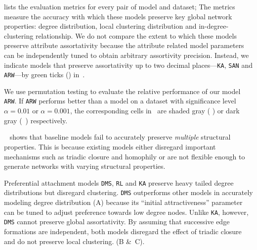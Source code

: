  lists the evaluation metrics for every pair of model
and dataset; The metrics measure the accuracy with which these models
preserve key global network properties: degree distribution, local clustering distribution
and in-degree-clustering relationship. We do not compare the extent to which these models preserve attribute assortativity because the attribute related model parameters can be independently tuned to obtain arbitrary assortivity precision. Instead, we indicate models that preserve assortativity up to two decimal
places---\texttt{KA}, \texttt{SAN} and \texttt{ARW}---by green ticks (\checkmark) in~.

We use permutation testing \cite{good2013permutation} to evaluate the relative performance of our model \texttt{ARW}. If
\texttt{ARW} performs better than a model on a dataset with significance level
$\alpha=0.01$ or $\alpha=0.001$, the corresponding cells in~
are shaded gray ( \lightgraybg{ }) or dark gray (~\darkgraybg{ }) respectively.


~ shows that baseline models fail to accurately preserve \textit{multiple} structural properties. This is because existing models either disregard important mechanisms such as triadic closure and homophily or are not flexible enough to generate networks with varying structural properties.


Preferential attachment models \texttt{DMS}, \texttt{RL}
and \texttt{KA} preserve heavy tailed degree distributions but disregard
clustering. \texttt{DMS} outperforms other models in accurately modeling
degree distribution (A) because its ``initial attractiveness''
parameter can be tuned to adjust preference towards low degree nodes. Unlike \texttt{KA}, however,
\texttt{DMS} cannot preserve global assortativity.
By assuming that successive edge formations are independent, both models disregard
the effect of triadic closure and do not preserve local clustering. (B \&~C).

